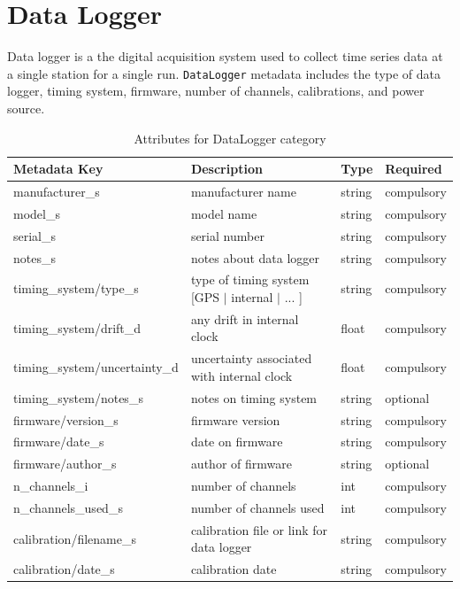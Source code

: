 \documentclass{article}
\begin{document}
\newpage
\section{Data Logger}

Data logger is a the digital acquisition system used to collect time series data at a single station for a single run.  \verb|DataLogger| metadata includes the type of data logger, timing system, firmware, number of channels, calibrations, and power source.

\begin{table}[htb!]
	\caption[Attributes for DataLogger]{Attributes for DataLogger category}
	\begin{tabular}{|l|p{3in}|l|l|}
		\hline
		\textbf{Metadata Key} & \textbf{Description} & \textbf{Type} & \textbf{Required} \\ \hline
		manufacturer\_s & manufacturer name & string & compulsory \\ \hline
		model\_s & model name & string & compulsory \\ \hline
		serial\_s & serial number & string & compulsory \\ \hline
		notes\_s & notes about data logger & string & compulsory \\ \hline
		timing\_system/type\_s & type of timing system [GPS $|$ internal $|$ ... ] & string & compulsory \\ \hline
		timing\_system/drift\_d & any drift in internal clock & float & compulsory \\ \hline
		timing\_system/uncertainty\_d & uncertainty associated with internal clock & float & compulsory \\ \hline
		timing\_system/notes\_s & notes on timing system & string & optional \\ \hline
		firmware/version\_s & firmware version & string & compulsory \\ \hline
		firmware/date\_s & date on firmware & string & compulsory \\ \hline
		firmware/author\_s & author of firmware & string & optional \\ \hline
		n\_channels\_i & number of channels & int & compulsory \\ \hline
		n\_channels\_used\_s & number of channels used & int & compulsory \\ \hline
		calibration/filename\_s & calibration file or link for data logger & string & compulsory \\ \hline
		calibration/date\_s & calibration date & string & compulsory \\ \hline

\end{tabular}
\end{table}
\end{document}
